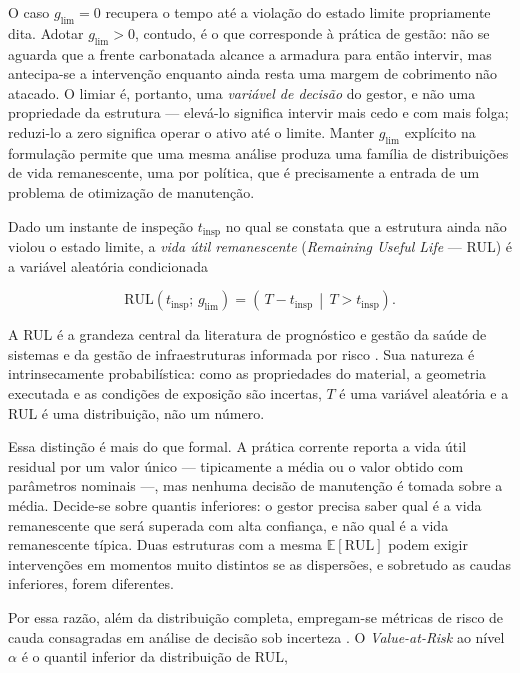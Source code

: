 O caso $g_{\mathrm{lim}} = 0$ recupera o tempo até a violação do estado limite propriamente dita. Adotar $g_{\mathrm{lim}} > 0$, contudo, é o que corresponde à prática de gestão: não se aguarda que a frente carbonatada alcance a armadura para então intervir, mas antecipa-se a intervenção enquanto ainda resta uma margem de cobrimento não atacado. O limiar é, portanto, uma \textit{variável de decisão} do gestor, e não uma propriedade da estrutura --- elevá-lo significa intervir mais cedo e com mais folga; reduzi-lo a zero significa operar o ativo até o limite. Manter $g_{\mathrm{lim}}$ explícito na formulação permite que uma mesma análise produza uma família de distribuições de vida remanescente, uma por política, que é precisamente a entrada de um problema de otimização de manutenção.

Dado um instante de inspeção $t_{\mathrm{insp}}$ no qual se constata que a estrutura ainda não violou o estado limite, a \textit{vida útil remanescente} (\textit{Remaining Useful Life} --- RUL) é a variável aleatória condicionada

\begin{equation}
\mathrm{RUL}(t_{\mathrm{insp}};\, g_{\mathrm{lim}}) = \left(\, T - t_{\mathrm{insp}} \,\middle|\, T > t_{\mathrm{insp}} \right).
\label{eq:rul}
\end{equation}

A RUL é a grandeza central da literatura de prognóstico e gestão da saúde de sistemas \parencite{si2011} e da gestão de infraestruturas informada por risco \parencite{frangopol2011, vannoortwijk2009}. Sua natureza é intrinsecamente probabilística: como as propriedades do material, a geometria executada e as condições de exposição são incertas, $T$ é uma variável aleatória e a RUL é uma distribuição, não um número.

Essa distinção é mais do que formal. A prática corrente reporta a vida útil residual por um valor único --- tipicamente a média ou o valor obtido com parâmetros nominais ---, mas nenhuma decisão de manutenção é tomada sobre a média. Decide-se sobre quantis inferiores: o gestor precisa saber qual é a vida remanescente que será superada com alta confiança, e não qual é a vida remanescente típica. Duas estruturas com a mesma $\mathbb{E}[\mathrm{RUL}]$ podem exigir intervenções em momentos muito distintos se as dispersões, e sobretudo as caudas inferiores, forem diferentes.

Por essa razão, além da distribuição completa, empregam-se métricas de risco de cauda consagradas em análise de decisão sob incerteza \parencite{rockafellar2000}. O \textit{Value-at-Risk} ao nível $\alpha$ é o quantil inferior da distribuição de RUL,

